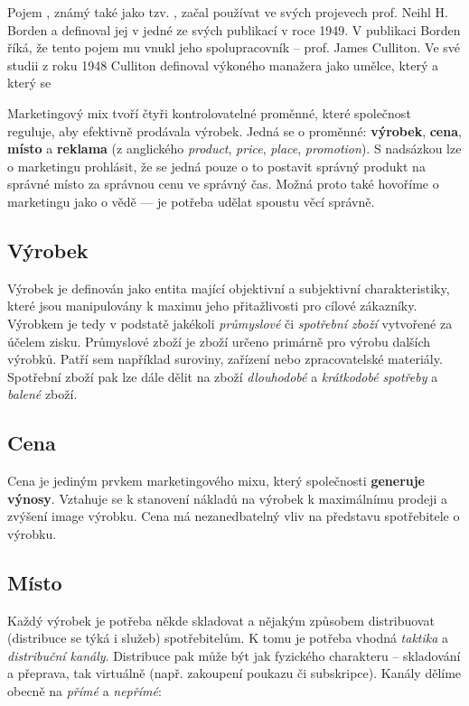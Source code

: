 Pojem , známý také jako tzv. , začal používat ve svých projevech prof. Neihl H. Borden a definoval jej v jedné ze svých publikací\cite{borden1964marketingmix} v roce 1949. V publikaci Borden říká, že tento pojem mu vnukl jeho spolupracovník -- prof. James Culliton. Ve své studii z roku 1948 Culliton definoval výkoného manažera jako umělce, který  a který se 

Marketingový mix tvoří čtyři kontrolovatelné proměnné, které společnost reguluje, aby efektivně prodávala výrobek. Jedná se o proměnné: \textbf{výrobek}, \textbf{cena}, \textbf{místo} a \textbf{reklama} (z anglického \textit{product}, \textit{price}, \textit{place}, \textit{promotion})\cite{clemente2004slovnikmarketingu}.
S nadsázkou lze o marketingu prohlásit, že se jedná pouze o to postavit správný produkt na správné místo za správnou cenu ve správný čas. Možná proto také hovoříme o marketingu jako o vědě --- je potřeba udělat spoustu věcí správně.


\subsection{Výrobek}
    
Výrobek je definován jako entita mající objektivní a subjektivní charakteristiky, které jsou manipulovány k maximu jeho přitažlivosti pro cílové zákazníky\cite{clemente2004slovnikmarketingu}. Výrobkem je tedy v podstatě jakékoli \textit{průmyslové} či \textit{spotřební zboží} vytvořené za účelem zisku.
Průmyslové zboží je zboží určeno primárně pro výrobu dalších výrobků. Patří sem například suroviny, zařízení nebo zpracovatelské materiály.
Spotřební zboží pak lze dále dělit na zboží \textit{dlouhodobé} a \textit{krátkodobé spotřeby} a \textit{balené} zboží.


\subsection{Cena}
Cena je jediným prvkem marketingového mixu, který společnosti \textbf{generuje výnosy}. Vztahuje se k stanovení nákladů na výrobek k maximálnímu prodeji a zvýšení image výrobku. Cena má nezanedbatelný vliv na představu spotřebitele o výrobku\cite{clemente2004slovnikmarketingu}.


\subsection{Místo}
Každý výrobek je potřeba někde skladovat a nějakým způsobem distribuovat (distribuce se týká i služeb) spotřebitelům. K tomu je potřeba vhodná \textit{taktika} a \textit{distribuční kanály}. Distribuce pak může být jak fyzického charakteru -- skladování a přeprava, tak virtuálně (např. zakoupení poukazu či subskripce). Kanály dělíme obecně na \textit{přímé} a \textit{nepřímé}:

